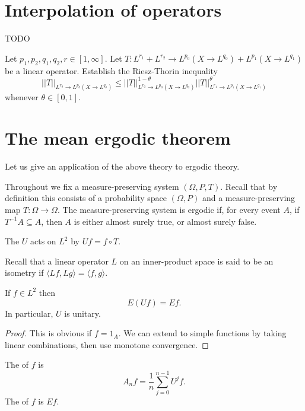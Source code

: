 \section{Interpolation of operators}
TODO

\begin{exercise}
Let $p_1,p_2,q_1,q_2,r \in [1, \infty]$. Let $T: L^{r_1} + L^{r_2} \to L^{p_0}(X \to L^{q_0}) + L^{p_1}(X \to L^{q_1})$ be a linear operator.
Establish the Riesz-Thorin inequality
$$||T||_{L^{r_\theta} \to L^{p_\theta}(X \to L^{q_\theta})} \leq ||T||_{L^{r_0} \to L^{p_0}(X \to L^{q_0})}^{1 - \theta} ||T||_{L^{r_1} \to L^{p_1}(X \to L^{q_1})}^\theta$$
whenever $\theta \in [0, 1]$.
\end{exercise}

\section{The mean ergodic theorem}
Let us give an application of the above theory to ergodic theory.

Throughout we fix a measure-preserving system $(\Omega, P, T)$.
Recall that by definition this consists of a probability space $(\Omega, P)$ and a measure-preserving map $T: \Omega \to \Omega$.
The measure-preserving system is ergodic if, for every event $A$, if $T^{-1}A \subseteq A$, then $A$ is either almost surely true, or almost surely false.

\begin{definition}
The  $U$ acts on $L^2$ by $Uf = f \circ T$.
\end{definition}

Recall that a linear operator $L$ on an inner-product space is said to be an isometry if $\langle Lf, Lg\rangle = \langle f, g\rangle$.

\begin{lemma}
If $f \in L^2$ then
$$E(Uf) = Ef.$$
In particular, $U$ is unitary.
\end{lemma}
\begin{proof}
This is obvious if $f = 1_A$.
We can extend to simple functions by taking linear combinations, then use monotone convergence.
\end{proof}

\begin{definition}
The  of $f$ is
$$A_nf = \frac{1}{n} \sum_{j=0}^{n-1} U^jf.$$
The  of $f$ is $Ef$.
\end{definition}

